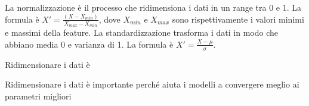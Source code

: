 La normalizzazione è il processo che ridimensiona i dati in un range tra 0 e
1. La formula è $X'=\frac{(X-X_{min})}{X_{max}-X_{min}}$, dove $X_{min}$ e
$X_{max}$ sono rispettivamente i valori minimi e massimi della feature. La
standardizzazione trasforma i dati in modo che abbiano media 0 e varianza di
1. La formula è $X'=\frac{X-\mu}{\sigma}$.

Ridimensionare i dati è 

Ridimensionare i dati è importante perché aiuta i modelli a convergere meglio
ai parametri migliori


%




%
%
%

